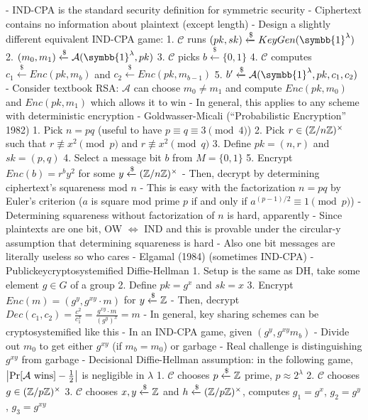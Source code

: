 \documentclass[notes]{agony}
\newcommand{\xgets}{\xleftarrow}
\newcommand{\one}{\symbb{1}}
\begin{document}
\begin{markdown}
- IND-CPA is the standard security definition for symmetric security
    - Ciphertext contains no information about plaintext (except length)
- Design a slightly different equivalent IND-CPA game:
    1. $\mathcal C$ runs $(pk, sk) \xgets{\$} KeyGen(\one^\lambda)$
    2. $(m_0,m_1) \xgets{\$} \mathcal A(\one^\lambda, pk)$
    3. $\mathcal C$ picks $b \xgets{\$} \{0,1\}$
    4. $\mathcal C$ computes $c_1 \xgets{\$} Enc(pk, m_b)$ and $c_2 \xgets{\$} Enc(pk, m_{b-1})$
    5. $b' \xgets{\$} \mathcal A(\one^\lambda, pk, c_1, c_2)$
- Consider textbook RSA: $\mathcal A$ can choose $m_0 \neq m_1$ and compute $Enc(pk, m_0)$ and $Enc(pk, m_1)$ which allows it to win
    - In general, this applies to any scheme with deterministic encryption
- Goldwasser-Micali (``Probabilistic Encryption'' 1982)
    1. Pick $n = pq$ (useful to have $p \equiv q \equiv 3 \pmod 4$)
    2. Pick $r \in (\mathbb{Z}/n\mathbb{Z})^\times$ such that $r \not\equiv x^2 \pmod p$ and $r \not\equiv x^2 \pmod q$
    3. Define $pk = (n, r)$ and $sk = (p, q)$
    4. Select a message bit $b$ from $M = \{0,1\}$
    5. Encrypt $Enc(b) = r^b y^2$ for some $y \xgets{\$}(\Z/n\Z)^\times$
    - Then, decrypt by determining ciphertext's squareness mod $n$
        - This is easy with the factorization $n=pq$ by Euler's criterion ($a$ is square mod prime $p$ if and only if $a^{(p-1)/2} \equiv 1 \pmod p$)
        - Determining squareness without factorization of $n$ is hard, apparently
    - Since plaintexts are one bit, OW $\iff$ IND and this is provable under the circular-y assumption that determining squareness is hard
    - Also one bit messages are literally useless so who cares
- Elgamal (1984) (sometimes IND-CPA)
    - Publickeycryptosystemified Diffie-Hellman
    1. Setup is the same as DH, take some element $g \in G$ of a group
    2. Define $pk = g^x$ and $sk = x$
    3. Encrypt $Enc(m) = (g^y, g^{xy}\cdot m)$ for $y \xgets{\$} \Z$
    - Then, decrypt $Dec(c_1, c_2) = \frac{c^2}{c_1^x} = \frac{g^{xy}\cdot m}{(g^y)^x} = m$
    - In general, key sharing schemes can be cryptosystemified like this
    - In an IND-CPA game, given $(g^y, g^{xy}m_b)$
        - Divide out $m_0$ to get either $g^{xy}$ (if $m_b = m_0$) or garbage
        - Real challenge is distinguishing $g^{xy}$ from garbage
    - Decisional Diffie-Hellman assumption: in the following game, $\abs{\Pr[\mathcal A\text{ wins}]-\frac12}$ is negligible in $\lambda$
        1. $\mathcal C$ chooses $p \xgets{\$} \Z$ prime, $p \approx 2^\lambda$
        2. $\mathcal C$ chooses $g \in (\mathbb{Z}/p\mathbb{Z})^\times$
        3. $\mathcal C$ chooses $x,y \xgets{\$} \Z$ and $h \xgets{\$} (\Z/p\Z)^\times$, computes $g_1 = g^x$, $g_2 = g^y$, $g_3 = g^{xy}$

\end{markdown}
\end{document}
